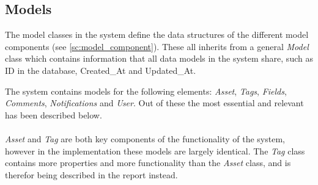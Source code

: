 \subsection{Models}
The model classes in the system define the data structures of the different model components (see \autoref{sc:model_component}). These all inherits from a general \textit{Model} class which contains information that all data models in the system share, such as ID in the database, Created\_At and Updated\_At. 
\par
The system contains models for the following elements: \textit{Asset}, \textit{Tags}, \textit{Fields}, \textit{Comments}, \textit{Notifications} and \textit{User}. Out of these the most essential and relevant has been described below. 
\\\\
\textit{Asset} and \textit{Tag} are both key components of the functionality of the system, however in the implementation these models are largely identical. The \textit{Tag} class contains more properties and more functionality than the \textit{Asset} class, and is therefor being described in the report instead.

